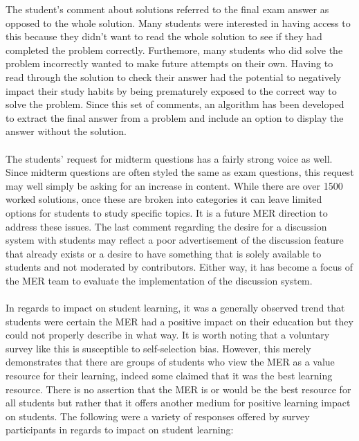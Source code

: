 \documentclass{primus}
\begin{document}
\noindent{}The student’s comment about solutions referred to the final exam answer as opposed to the whole solution.  Many students were interested in having access to this because they didn’t want to read the whole solution to see if they had completed the problem correctly.  Furthemore, many students who did solve the problem incorrectly wanted to make future attempts on their own.  Having to read through the solution to check their answer had the potential to negatively impact their study habits by being prematurely exposed to the correct way to solve the problem.  Since this set of comments, an algorithm has been developed to extract the final answer from a problem and include an option to display the answer without the solution.
\\\\
\noindent{}The students’ request for midterm questions has a fairly strong voice as well.  Since midterm questions are often styled the same as exam questions, this request may well simply be asking for an increase in content.  While there are over 1500 worked solutions, once these are broken into categories it can leave limited options for students to study specific topics.  It is a future MER direction to address these issues.  The last comment regarding the desire for a discussion system with students may reflect a poor advertisement of the discussion feature that already exists or a desire to have something that is solely available to students and not moderated by contributors.  Either way, it has become a focus of the MER team to evaluate the implementation of the discussion system.
\\\\
\noindent{}In regards to impact on student learning, it was a generally observed trend that students were certain the MER had a positive impact on their education but they could not properly describe in what way.  It is worth noting that a voluntary survey like this is susceptible to self-selection bias.  However, this merely demonstrates that there are groups of students who view the MER as a value resource for their learning, indeed some claimed that it was the best learning resource.  There is no assertion that the MER is or would be the best resource for all students but rather that it offers another medium for positive learning impact on students. The following were a variety of responses offered by survey participants in regards to impact on student learning:
\end{document}
